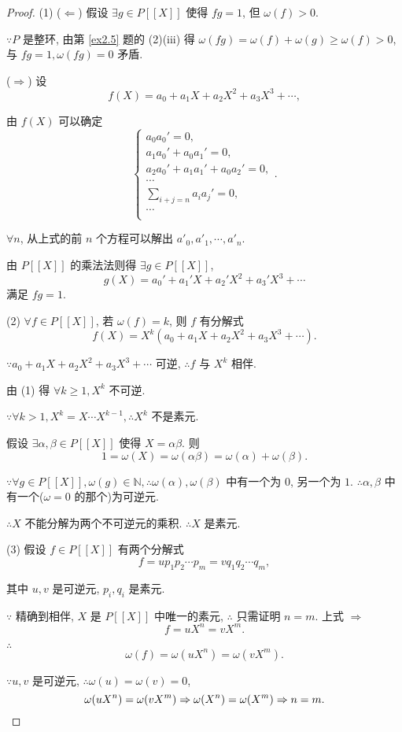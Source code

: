 \documentclass[color=black,device=normal,lang=cn,mode=geye]{elegantnote}
\begin{document}
\begin{proof}
    (1) ($\Leftarrow$) 假设 $\exists g\in P[[X]]$ 使得 $fg=1$, 但 $\omega(f)>0$.

    $\because P$ 是整环, 由第 \ref{ex2.5} 题的 (2)(iii) 得 $\omega(fg)=\omega(f)+\omega(g)\geq\omega(f)>0$, 与 $fg=1,\omega(fg)=0$ 矛盾.

    ($\Rightarrow$) 设
    \[f(X)=a_0+a_1X+a_2X^2+a_3X^3+\cdots,\]

    由 $f(X)$ 可以确定
    \[\begin{cases}
        a_0a_0'=0, \\
        a_1a_0'+a_0a_1'=0, \\
        a_2a_0'+a_1a_1'+a_0a_2'=0, \\
        \cdots \\
        \sum\limits_{i+j=n}a_ia_j'=0, \\
        \cdots \\
    \end{cases}.\]

    $\forall n$, 从上式的前 $n$ 个方程可以解出 $a'_0,a'_1,\cdots,a'_n$.

    由 $P[[X]]$ 的乘法法则得 $\exists g\in P[[X]]$,
    \[g(X)=a_0'+a_1'X+a_2'X^2+a_3'X^3+\cdots\]
    满足 $fg=1$.

    (2) $\forall f\in P[[X]]$, 若 $\omega(f)=k$, 则 $f$ 有分解式
    \[f(X)=X^k(a_0+a_1X+a_2X^2+a_3X^3+\cdots).\]

    $\because a_0+a_1X+a_2X^2+a_3X^3+\cdots$ 可逆, $\therefore f$ 与 $X^k$ 相伴.

    由 (1) 得 $\forall k\geq1,X^k$ 不可逆.

    $\because\forall k>1,X^k=X\cdots X^{k-1},\therefore X^k$ 不是素元.

    假设 $\exists\alpha,\beta\in P[[X]]$ 使得 $X=\alpha\beta$. 则
    \[1=\omega(X)=\omega(\alpha\beta)=\omega(\alpha)+\omega(\beta).\]

    $\because\forall g\in P[[X]],\omega(g)\in\mathbb{N},\therefore\omega(\alpha),\omega(\beta)$ 中有一个为 $0$, 另一个为 $1$. $\therefore\alpha,\beta$ 中有一个($\omega=0$ 的那个)为可逆元.

    $\therefore X$ 不能分解为两个不可逆元的乘积. $\therefore X$ 是素元.

    (3) 假设 $f\in P[[X]]$ 有两个分解式
    \[f=up_1p_2\cdots p_m=vq_1q_2\cdots q_m,\]

    其中 $u,v$ 是可逆元, $p_i,q_i$ 是素元.

    $\because$ 精确到相伴, $X$ 是 $P[[X]]$ 中唯一的素元, $\therefore$ 只需证明 $n=m$. 上式 $\Rightarrow$
    \[f=uX^n=vX^m.\]

    $\therefore$
    \[\omega(f)=\omega(uX^n)=\omega(vX^m).\]

    $\because u,v$ 是可逆元, $\therefore\omega(u)=\omega(v)=0$,
    \[\omega(uX^n)=\omega(vX^m)\Rightarrow\omega(X^n)=\omega(X^m)\Rightarrow n=m.\qedhere\]
\end{proof}
\end{document}
